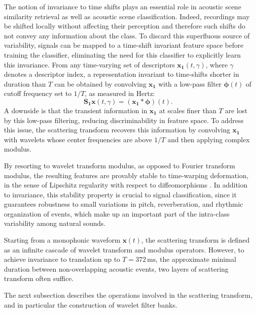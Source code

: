 The notion of invariance to time shifts plays an essential role in acoustic scene similarity retrieval as well as acoustic scene classification.
Indeed, recordings may be shifted locally without affecting their perception and therefore such shifts do not convey any information about the class.
To discard this superfluous source of variability, signals can be mapped to a time-shift invariant feature space before training the classifier, eliminating the need for this classifier to explicitly learn this invariance.
From any time-varying set of descriptors $\boldsymbol{x_1}(t,\gamma)$, where $\gamma$ denotes a descriptor index, a representation invariant to time-shifts shorter in duration than $T$ can be obtained by convolving $\boldsymbol{x_1}$ with a low-pass filter $\boldsymbol{\phi}(t)$ of cutoff frequency set to $1/T$, as measured in Hertz:
\begin{equation}
\mathbf{S_1}\boldsymbol{x}(t, \gamma) = (\boldsymbol{x_1} \ast \boldsymbol{\phi}) (t).
\end{equation}
A downside is that the transient information in $\boldsymbol{x_1}$ at scales finer than $T$ are lost by this low-pass filtering, reducing discriminability in feature space.
To address this issue, the scattering transform recovers this information by convolving $\boldsymbol{x_1}$ with wavelets whose center frequencies are above $1/T$ and then applying complex modulus.

By resorting to wavelet transform modulus, as opposed to Fourier transform modulus, the resulting features are provably stable to time-warping deformation,
in the sense of Lipschitz regularity with respect to diffeomorphisms \cite{Mallat2012}.
In addition to invariance, this stability property is crucial to signal classification, since it guarantees robustness to small variations in pitch, reverberation, and rhythmic organization of events, which make up an important part of the intra-class variability among natural sounds.

Starting from a monophonic waveform $\boldsymbol{x}(t)$, the scattering transform is defined as an infinite cascade of wavelet transform and modulus operators.
However, to achieve invariance to translation up to $T = 372\,\mathrm{ms}$, \ie the approximate minimal duration between non-overlapping acoustic events, two layers of scattering transform often suffice.

The next subsection describes the operations involved in the scattering transform, and in particular the construction of wavelet filter banks.

